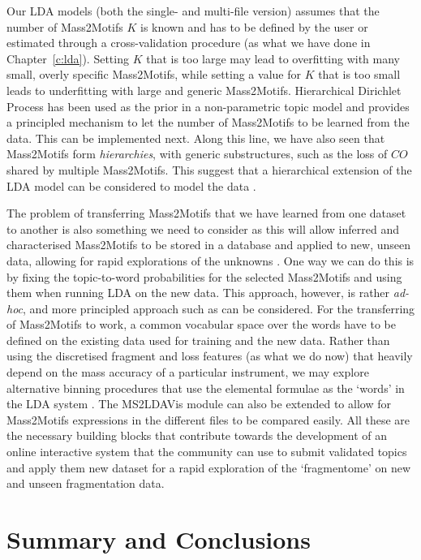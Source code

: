 Our LDA models (both the single- and multi-file version) assumes that the number of Mass2Motifs $K$ is known and has to be defined by the user or estimated through a cross-validation procedure (as what we have done in Chapter~\ref{c:lda}). Setting $K$ that is too large may lead to overfitting with many small, overly specific Mass2Motifs, while setting a value for $K$ that is too small leads to underfitting with large and generic Mass2Motifs. Hierarchical Dirichlet Process has been used as the prior in a non-parametric topic model \cite{teh2012hierarchical} and provides a principled mechanism to let the number of Mass2Motifs to be learned from the data. This can be implemented next. Along this line, we have also seen that Mass2Motifs form \emph{hierarchies}, with generic substructures, such as the loss of $CO$ shared by multiple Mass2Motifs. This suggest that a hierarchical extension of the LDA model can be considered to model the data \cite{griffiths2004hierarchical}. 

The problem of transferring Mass2Motifs that we have learned from one dataset to another is also something we need to consider as this will allow inferred and characterised Mass2Motifs to be stored in a database and applied to new, unseen data, allowing for rapid explorations of the unknowns . One way we can do this is by fixing the topic-to-word probabilities for the selected Mass2Motifs and using them when running LDA on the new data. This approach, however, is rather \textit{ad-hoc}, and more principled approach such as \cite{kang2012transfer} can be considered. For the transferring of Mass2Motifs to work, a common vocabular space over the words have to be defined on the existing data used for training and the new data. Rather than using the discretised fragment and loss features (as what we do now) that heavily depend on the mass accuracy of a particular instrument, we may explore alternative binning procedures that use the elemental formulae as the `words' in the LDA system . The MS2LDAVis module can also be extended to allow for Mass2Motifs expressions in the different files to be compared easily. All these are the necessary building blocks that contribute towards the development of an online interactive system that the community can use to submit validated topics and apply them new dataset for a rapid exploration of the `fragmentome' on new and unseen fragmentation data.

\section{Summary and Conclusions}

